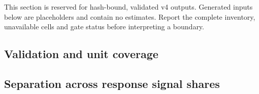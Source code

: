 This section is reserved for hash-bound, validated v4 outputs. Generated inputs below are placeholders and contain no estimates. Report the complete inventory, unavailable cells and gate status before interpreting a boundary.

\subsection{Validation and unit coverage}



\subsection{Separation across response signal shares}




